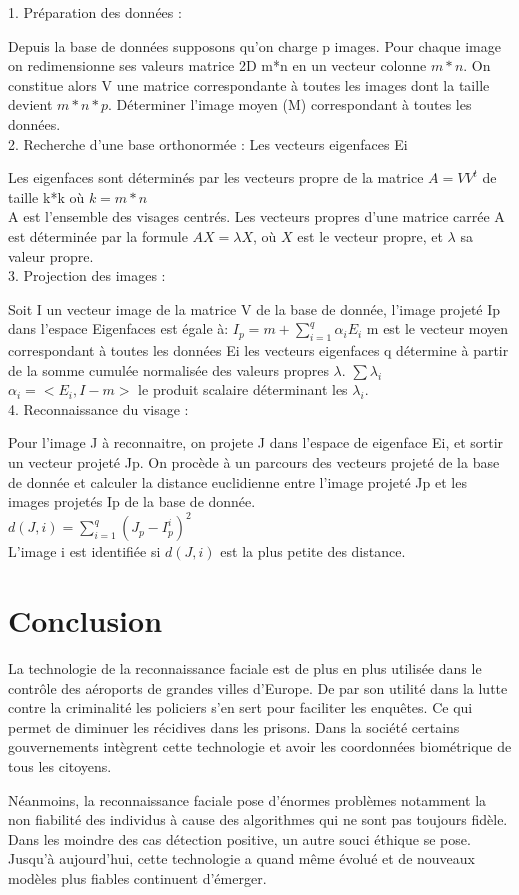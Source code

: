 \documentclass[12pt, letterpaper]{article}
\begin{document}
1. Préparation des données :
\par Depuis la base de données supposons qu’on charge p images.
Pour chaque image on redimensionne ses valeurs matrice 2D m*n en un vecteur colonne $m*n$. On constitue alors V une matrice correspondante à toutes les images dont la taille devient $m*n*p$.
Déterminer l’image moyen (M) correspondant à toutes les données.\\

2. Recherche d’une base orthonormée : Les vecteurs eigenfaces Ei
\par Les eigenfaces sont déterminés par les vecteurs propre de la matrice 
$A=VV^{t}$ de taille k*k où $k = m*n$ \\A est l’ensemble des visages centrés. 
Les vecteurs propres d’une matrice carrée A est déterminée par la formule 
$AX=\lambda X$, où $X$ est le vecteur propre, et $\lambda$ sa valeur propre.\\

3. Projection des images :
\par Soit I un vecteur image de la matrice V de la base de donnée, l’image projeté Ip dans l’espace Eigenfaces est égale à:
$I_{p} = m +\sum_{i=1}^{q} \alpha_{i}E_{i}$
m est le vecteur moyen correspondant à toutes les données
Ei les vecteurs eigenfaces
q détermine à partir de la somme cumulée normalisée des valeurs propres $\lambda$.
$\sum \lambda_{i}$
$\alpha_{i}= <E_{i}, I-m>$ le produit scalaire  déterminant les $\lambda_{i}$.\\

4. Reconnaissance du visage :
\par Pour l’image J à reconnaitre, on projete J dans l’espace de eigenface Ei, et sortir un vecteur projeté Jp.
On procède à un parcours des vecteurs projeté de la base de donnée et calculer la distance euclidienne entre l’image projeté Jp et les images projetés Ip de la base de donnée. \\
$d(J,i) = \sum_{i=1}^{q} (J_{p}-I_{p}^{i})^{2}$\\
L’image i est identifiée si $d(J,i)$ est la plus petite des distance.


\newpage
\section{Conclusion}
La technologie de la reconnaissance faciale est de plus en plus utilisée dans le contrôle des aéroports de grandes villes d’Europe. De par son utilité dans la lutte contre la criminalité les policiers s'en sert pour faciliter les enquêtes. Ce qui permet de diminuer les récidives dans les prisons. Dans la société certains gouvernements intègrent cette technologie et avoir les coordonnées biométrique de tous les citoyens. \par Néanmoins, la reconnaissance faciale pose d’énormes problèmes notamment la non fiabilité des individus à cause des algorithmes qui ne sont pas toujours fidèle. Dans les moindre des cas détection positive, un autre souci éthique se pose. Jusqu'à aujourd'hui, cette technologie a quand même évolué et de nouveaux modèles plus fiables continuent d'émerger.  
\end{document}
